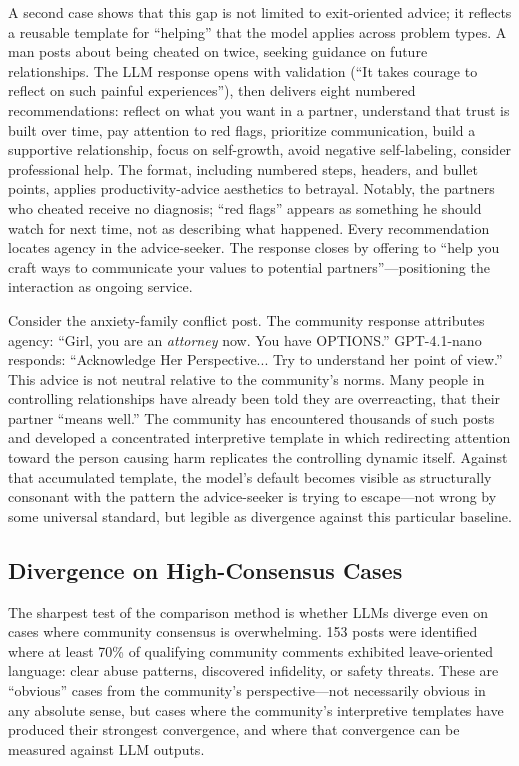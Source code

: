 A second case shows that this gap is not limited to exit-oriented advice; it reflects a reusable template for ``helping'' that the model applies across problem types. A man posts about being cheated on twice, seeking guidance on future relationships. The LLM response opens with validation (``It takes courage to reflect on such painful experiences''), then delivers eight numbered recommendations: reflect on what you want in a partner, understand that trust is built over time, pay attention to red flags, prioritize communication, build a supportive relationship, focus on self-growth, avoid negative self-labeling, consider professional help. The format, including numbered steps, headers, and bullet points, applies productivity-advice aesthetics to betrayal. Notably, the partners who cheated receive no diagnosis; ``red flags'' appears as something he should watch for next time, not as describing what happened. Every recommendation locates agency in the advice-seeker. The response closes by offering to ``help you craft ways to communicate your values to potential partners''---positioning the interaction as ongoing service.

Consider the anxiety-family conflict post. The community response attributes agency: ``Girl, you are an \textit{attorney} now. You have OPTIONS.'' GPT-4.1-nano responds: ``Acknowledge Her Perspective... Try to understand her point of view.'' This advice is not neutral relative to the community's norms. Many people in controlling relationships have already been told they are overreacting, that their partner ``means well.'' The community has encountered thousands of such posts and developed a concentrated interpretive template in which redirecting attention toward the person causing harm replicates the controlling dynamic itself. Against that accumulated template, the model's default becomes visible as structurally consonant with the pattern the advice-seeker is trying to escape---not wrong by some universal standard, but legible as divergence against this particular baseline.

\subsection{Divergence on High-Consensus Cases}

The sharpest test of the comparison method is whether LLMs diverge even on cases where community consensus is overwhelming. 153 posts were identified where at least 70\% of qualifying community comments exhibited leave-oriented language: clear abuse patterns, discovered infidelity, or safety threats. These are ``obvious'' cases from the community's perspective---not necessarily obvious in any absolute sense, but cases where the community's interpretive templates have produced their strongest convergence, and where that convergence can be measured against LLM outputs.

